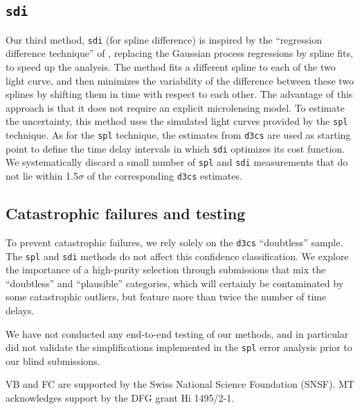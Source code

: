 \documentclass[traditabstract]{aa}
\begin{document}
\subsection{\tt sdi}

Our third method, {\tt sdi} (for spline difference) is inspired by the ``regression difference technique'' of \citet{pycs}, replacing the Gaussian process regressions by spline fits, to speed up the analysis. The method fits a different spline to each of the two light curve, and then minimizes the variability of the difference between these two splines by shifting them in time with respect to each other. The advantage of this approach is that it does not require an explicit microlensing model. To estimate the uncertainty, this method uses the simulated light curves provided by the {\tt spl} technique. As for the {\tt spl} technique, the estimates from {\tt d3cs} are used as starting point to define the time delay intervals in which {\tt sdi} optimizes its cost function. We systematically discard a small number of {\tt spl} and {\tt sdi} measurements that do not lie within 1.5$\sigma$ of the corresponding {\tt d3cs} estimates.


\subsection{Catastrophic failures and testing}

To prevent catastrophic failures, we rely solely on the {\tt d3cs} ``doubtless'' sample. The {\tt spl} and {\tt sdi} methods do not affect this confidence classification. We explore the importance of a high-purity selection through submissions that mix the ``doubtless'' and ``plausible'' categories, which will certainly be contaminated by some catastrophic outliers, but feature more than twice the number of time delays.

We have not conducted any end-to-end testing of our methods, and in particular did not validate the simplifications implemented in the {\tt spl} error analysis prior to our blind submissions. 





\begin{acknowledgements}
VB and FC are supported by the Swiss National Science Foundation (SNSF). MT acknowledges support by the DFG grant Hi 1495/2-1.
\end{acknowledgements}





\end{document}
